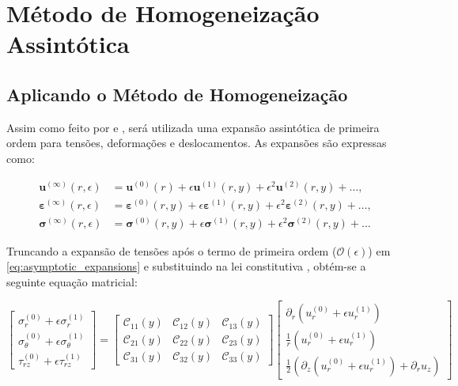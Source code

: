\chapter{Método de Homogeneização Assintótica}

\section{Aplicando o Método de Homogeneização}

Assim como feito por \cite{PartonReport} e \cite{Guinovart2024}, será utilizada uma expansão assintótica de primeira ordem para tensões, deformações e deslocamentos. As expansões são expressas como:

\begin{equation}
  \begin{aligned}
    \mathbf{u}^{(\infty)}(r, \epsilon) &= \mathbf{u}^{(0)}(r) + \epsilon \mathbf{u}^{(1)}(r, y) + \epsilon^2 \mathbf{u}^{(2)}(r, y) + \dots, \\
    \boldsymbol{\varepsilon}^{(\infty)}(r, \epsilon) &= \boldsymbol{\varepsilon}^{(0)}(r, y) + \epsilon \boldsymbol{\varepsilon}^{(1)}(r, y) + \epsilon^2 \boldsymbol{\varepsilon}^{(2)}(r, y) + \dots, \\
    \boldsymbol{\sigma}^{(\infty)}(r, \epsilon) &= \boldsymbol{\sigma}^{(0)}(r, y) + \epsilon \boldsymbol{\sigma}^{(1)}(r, y) + \epsilon^2 \boldsymbol{\sigma}^{(2)}(r, y) + \dots
  \end{aligned}
  \label{eq:asymptotic_expansions}
\end{equation}

Truncando a expansão de tensões após o termo de primeira ordem ($\mathcal{O}(\epsilon)$) em \eqref{eq:asymptotic_expansions} e substituindo na lei constitutiva , obtém-se a seguinte equação matricial:

\begin{equation}
  \begin{bmatrix}
    \sigma_r^{(0)} + \epsilon \sigma_r^{(1)} \\
    \sigma_\theta^{(0)} + \epsilon \sigma_\theta^{(1)} \\
    \tau_{rz}^{(0)} + \epsilon \tau_{rz}^{(1)}
  \end{bmatrix}
  =
  \begin{bmatrix}
    \mathcal{C}_{11}(y) & \mathcal{C}_{12}(y) & \mathcal{C}_{13}(y) \\
    \mathcal{C}_{21}(y) & \mathcal{C}_{22}(y) & \mathcal{C}_{23}(y) \\
    \mathcal{C}_{31}(y) & \mathcal{C}_{32}(y) & \mathcal{C}_{33}(y)
  \end{bmatrix}
  \begin{bmatrix}
    \partial_r (u_r^{(0)} + \epsilon u_r^{(1)}) \\
    \frac{1}{r}(u_r^{(0)} + \epsilon u_r^{(1)}) \\
    \frac{1}{2}(\partial_z (u_r^{(0)} + \epsilon u_r^{(1)}) + \partial_r u_z)
  \end{bmatrix}
  \label{eq:HookesLawWithSAF_MatrixForm}
\end{equation}

